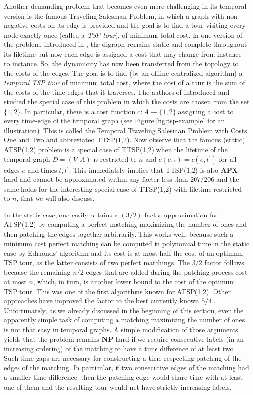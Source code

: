 \documentclass[oribibl, 11pt]{llncs}
\newcommand{\rem}{\mathbf}
\begin{document}
Another demanding problem that becomes even more challenging in its temporal version is the famous {\sc Traveling Salesman Problem}, in which a graph with non-negative costs on its edge is provided and the goal is to find a tour visiting every node exactly once (called a \emph{TSP tour}), of minimum total cost. In one version of the problem, introduced in \cite{MS14}, the digraph remains static and complete throughout its lifetime but now each edge is assigned a cost that may change from instance to instance. So, the dynamicity has now been transferred from the topology to the costs of the edges. The goal is to find (by an offline centralized algorithm) a \emph{temporal TSP tour} of minimum total cost, where the cost of a tour is the sum of the costs of the time-edges that it traverses. The authors of \cite{MS14} introduced and studied the special case of this problem in which the costs are chosen from the set $\{1,2\}$. In particular, there is a cost function $c:A\rightarrow \{1,2\}$ assigning a cost to every time-edge of the temporal graph (see Figure \ref{fig:tsp-example} for an illustration). This is called the {\sc Temporal Traveling Salesman Problem with Costs One and Two} and abbreviated TTSP(1,2). Now observe that the famous (static) ATSP(1,2) problem is a special case of TTSP(1,2) when the lifetime of the temporal graph $D=(V,A)$ is restricted to $n$ and $c(e,t)=c(e,t^\prime)$ for all edges $e$ and times $t,t^\prime$. This immediately implies that TTSP(1,2) is also $\rem{APX}$-hard \cite{PY93} and cannot be approximated within any factor less than $207/206$ \cite{KS13} and the same holds for the interesting special case of TTSP(1,2) with lifetime restricted to $n$, that we will also discuss.

In the static case, one easily obtains a $(3/2)$-factor approximation for ATSP(1,2) by computing a perfect matching maximizing the number of ones and then patching the edges together arbitrarily. This works well, because such a minimum cost perfect matching can be computed in polynomial time in the static case by Edmonds' algorithm \cite{Ed65} and its cost is at most half the cost of an optimum TSP tour, as the latter consists of two perfect matchings. The $3/2$ factor follows because the remaining $n/2$ edges that are added during the patching process cost at most $n$, which, in turn, is another lower bound to the cost of the optimum TSP tour. This was one of the first algorithms known for ATSP(1,2). Other approaches have improved the factor to the best currently known $5/4$ \cite{Bl04}. Unfortunately, as we already discussed in the beginning of this section, even the apparently simple task of computing a matching maximizing the number of ones is not that easy in temporal graphs. A simple modification of those arguments yields that the problem remains $\rem{NP}$-hard if we require consecutive labels (in an increasing ordering) of the matching to have a time difference of at least two. Such time-gaps are necessary for constructing a time-respecting patching of the edges of the matching. In particular, if two consecutive edges of the matching had a smaller time difference, then the patching-edge would share time with at least one of them and the resulting tour would not have strictly increasing labels.
\end{document}
